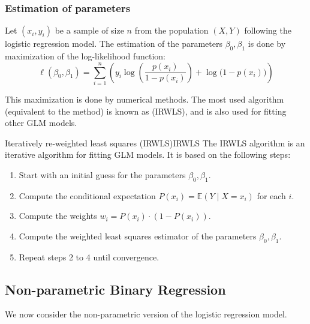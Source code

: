 \subsubsection{Estimation of parameters}
Let $(x_i, y_i)$ be a sample of size $n$ from the population $(X, Y)$ following
the logistic regression model. The estimation of the parameters $\beta_0, \beta_1$
is done by maximization of the log-likelihood function:
\begin{equation*}
    \ell(\beta_0, \beta_1) = \sum_{i=1}^n \left(y_i \log \left( \frac{p(x_i)}{1 - p(x_i)} \right) + \log\bigl(1 - p(x_i)\bigr) \right)
\end{equation*}

This maximization is done by numerical methods. The most used algorithm
(equivalent to the  method)
is known as  (IRWLS), and
is also used for fitting other GLM models.

\begin{definition}{Iteratively re-weighted least squares (IRWLS)}{IRWLS}
    The IRWLS algorithm is an iterative algorithm for fitting GLM models.
    It is based on the following steps:
    \begin{enumerate}
        \item Start with an initial guess for the parameters $\beta_0, \beta_1$.
        \item Compute the conditional expectation $P(x_i) = \mathds{E}(Y \mid X = x_i)$
            for each $i$.
        \item Compute the weights $w_i = P(x_i) \cdot (1 - P(x_i))$.
        \item Compute the weighted least squares estimator of the parameters
            $\beta_0, \beta_1$.
        \item Repeat steps 2 to 4 until convergence.
    \end{enumerate}
\end{definition}

\subsection{Non-parametric Binary Regression}
We now consider the non-parametric version of the logistic regression model.

